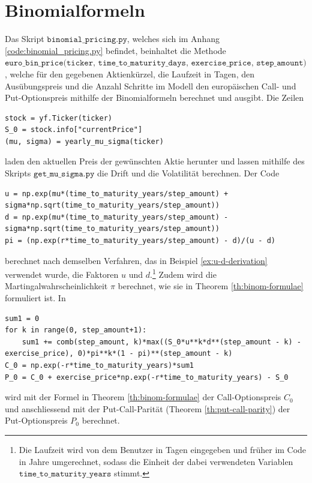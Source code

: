 \documentclass[11pt]{report} %
\begin{document}
\section{Binomialformeln}
Das Skript $\texttt{binomial\_pricing.py}$, welches sich im Anhang \ref{code:binomial_pricing.py} befindet, beinhaltet die Methode $\texttt{euro\_bin\_price(ticker, time\_to\_maturity\_days, exercise\_price, step\_amount)}$, welche für den gegebenen Aktienkürzel, die Laufzeit in Tagen, den Ausübungspreis und die Anzahl Schritte im Modell den europäischen Call- und Put-Optionspreis mithilfe der Binomialformeln berechnet und ausgibt. Die Zeilen \begin{lstlisting}
stock = yf.Ticker(ticker)
S_0 = stock.info["currentPrice"]
(mu, sigma) = yearly_mu_sigma(ticker)
\end{lstlisting} laden den aktuellen Preis der gewünschten Aktie herunter und lassen mithilfe des Skripts $\texttt{get\_mu\_sigma.py}$ die Drift und die Volatilität berechnen. Der Code\begin{lstlisting}
u = np.exp(mu*(time_to_maturity_years/step_amount) + sigma*np.sqrt(time_to_maturity_years/step_amount))
d = np.exp(mu*(time_to_maturity_years/step_amount) - sigma*np.sqrt(time_to_maturity_years/step_amount))
pi = (np.exp(r*time_to_maturity_years/step_amount) - d)/(u - d)
\end{lstlisting} berechnet nach demselben Verfahren, das in Beispiel \ref{ex:u-d-derivation} verwendet wurde, die Faktoren $u$ und $d$.\footnote{Die Laufzeit wird von dem Benutzer in Tagen eingegeben und früher im Code in Jahre umgerechnet, sodass die Einheit der dabei verwendeten Variablen $\texttt{time\_to\_maturity\_years}$ stimmt.} Zudem wird die Martingalwahrscheinlichkeit $\pi$ berechnet, wie sie in Theorem \ref{th:binom-formulae} formuliert ist. In \begin{lstlisting}
sum1 = 0
for k in range(0, step_amount+1):
    sum1 += comb(step_amount, k)*max((S_0*u**k*d**(step_amount - k) - exercise_price), 0)*pi**k*(1 - pi)**(step_amount - k)
C_0 = np.exp(-r*time_to_maturity_years)*sum1
P_0 = C_0 + exercise_price*np.exp(-r*time_to_maturity_years) - S_0
\end{lstlisting}
wird mit der Formel in Theorem \ref{th:binom-formulae} der Call-Optionspreis $C_0$ und anschliessend mit der Put-Call-Parität (Theorem \ref{th:put-call-parity}) der Put-Optionspreis $P_0$ berechnet.
\end{document}
